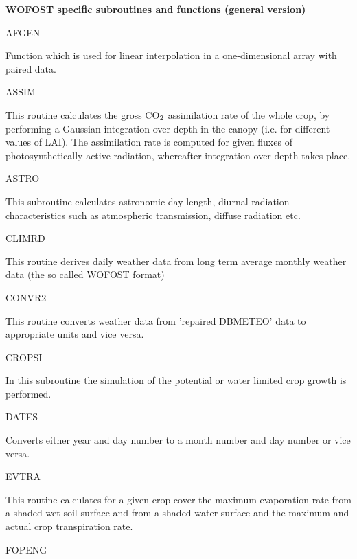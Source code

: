 \documentclass[11pt]{article}
\begin{document}
\bigskip
\bigskip
\bigskip
\bigskip
\bigskip
\bigskip
\bigskip
\bigskip
{\bf {\large WOFOST specific subroutines and functions (general version)}}

AFGEN
\testlastline

\begin{indenting}{2.54cm}
Function which is used for linear interpola\-tion in a one-di\-mensi\-onal array
with paired data.
\end{indenting}
ASSIM
\testlastline

\begin{indenting}{2.54cm}
This routine calculates the gross CO$_{{\rm 2}}$ assimilation rate of the whole crop,
by performing a Gaussian integration over depth in the canopy (i.e. for
different values of LAI). The assimilation rate is computed for given fluxes
of photosynthetically active radiation, whereafter integra\-tion over depth
takes place.
\end{indenting}
ASTRO
\testlastline

\begin{indenting}{2.54cm}
This subroutine calculates astronomic day length, diurnal radiation charac\-teristics such as atmospheric transmission, diffuse radiation etc. 
\end{indenting}
CLIMRD
\testlastline

\begin{indenting}{2.54cm}
This routine derives daily weather data from long term average monthly
weather data (the so called WOFOST format)
\end{indenting}
CONVR2
\testlastline

\begin{indenting}{2.54cm}
This routine converts weather data from 'repaired DBMETEO' data to
appropriate units and vice versa. 
\end{indenting}
CROPSI
\testlastline

\begin{indenting}{2.54cm}
In this subroutine the simulation of the potential or water limited crop
growth is performed.
\end{indenting}
DATES
\testlastline

\begin{indenting}{2.54cm}
Converts either year and day number to a month number and day number
or vice versa.
\end{indenting}
EVTRA
\testlastline

\begin{indenting}{2.54cm}
This routine calculates for a given crop cover the maximum evaporation
rate from a shaded wet soil surface and from a shaded water surface and
the maximum and actual crop transpiration rate.
\end{indenting}
FOPENG
\testlastline
\end{document}
